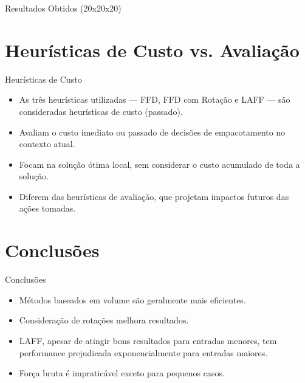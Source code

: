 \documentclass{beamer}
\begin{document}
\begin{frame}{Resultados Obtidos (20x20x20)}
	\begin{table}
		\centering

		\caption{Container 20x20x20 com 15 caixas}
	\end{table}
\end{frame}

\section{Heurísticas de Custo vs. Avaliação}
\begin{frame}{Heurísticas de Custo}
	\begin{itemize}
		\item As três heurísticas utilizadas — FFD, FFD com Rotação e LAFF — são consideradas heurísticas de custo (passado).
		\item Avaliam o custo imediato ou passado de decisões de empacotamento no contexto atual.
		\item Focam na solução ótima local, sem considerar o custo acumulado de toda a solução.
		\item Diferem das heurísticas de avaliação, que projetam impactos futuros das ações tomadas.
	\end{itemize}
\end{frame}

\section{Conclusões}
\begin{frame}{Conclusões}
	\begin{itemize}
		\item Métodos baseados em volume são geralmente mais eficientes.
		\item Consideração de rotações melhora resultados.
		\item LAFF, apesar de atingir bons resultados para entradas menores, tem performance prejudicada exponencialmente para entradas maiores.
		\item Força bruta é impraticável exceto para pequenos casos.
	\end{itemize}
\end{frame}
\end{document}
